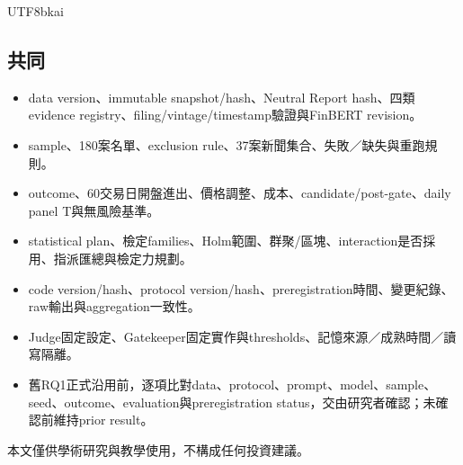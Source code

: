 \documentclass[12pt,a4paper]{article}
\begin{document}
\begin{CJK}{UTF8}{bkai}
\subsection*{共同}
\begin{itemize}
\item data version、immutable snapshot/hash、Neutral Report hash、四類evidence registry、filing/vintage/timestamp驗證與FinBERT revision。
\item sample、180案名單、exclusion rule、37案新聞集合、失敗／缺失與重跑規則。
\item outcome、60交易日開盤進出、價格調整、成本、candidate/post-gate、daily panel T與無風險基準。
\item statistical plan、檢定families、Holm範圍、群聚/區塊、interaction是否採用、指派匯總與檢定力規劃。
\item code version/hash、protocol version/hash、preregistration時間、變更紀錄、raw輸出與aggregation一致性。
\item Judge固定設定、Gatekeeper固定實作與thresholds、記憶來源／成熟時間／讀寫隔離。
\item 舊RQ1正式沿用前，逐項比對data、protocol、prompt、model、sample、seed、outcome、evaluation與preregistration status，交由研究者確認；未確認前維持prior result。
\end{itemize}
\noindent\small 本文僅供學術研究與教學使用，不構成任何投資建議。
\end{CJK}
\end{document}
